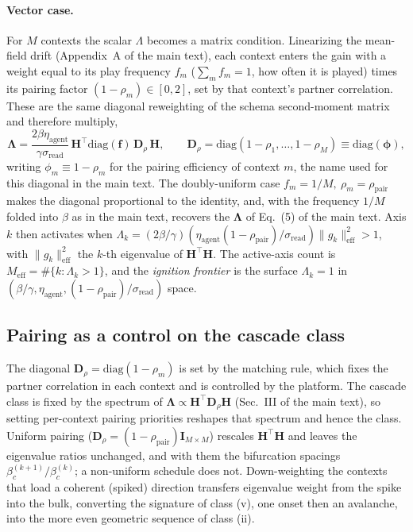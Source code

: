 \documentclass[
  aps,prx,
  preprint,
  superscriptaddress,
  nofootinbib
]{revtex4-2}
\newcommand{\Lam}{\bm{\Lambda}}
\newcommand{\Id}{\mathbf{I}}
\newcommand{\etaag}{\eta_{\mathrm{agent}}}
\newcommand{\rhopair}{\rho_{\mathrm{pair}}}
\newcommand{\sread}{\sigma_{\mathrm{read}}}
\begin{document}
\paragraph{Vector case.} For $M$ contexts the scalar $\Lambda$ becomes a matrix condition. Linearizing the mean-field drift (Appendix~A of the main text), each context enters the gain with a weight equal to its play frequency $f_m$ ($\sum_m f_m=1$, how often it is played) times its pairing factor $(1-\rho_m)\in[0,2]$, set by that context's partner correlation. These are the same diagonal reweighting of the schema second-moment matrix and therefore multiply,
\begin{equation}\label{SM-eq:sm-Geff}
\Lam=\frac{2\beta\etaag}{\gamma\sread}\,\bm{H}^{\!\top}\mathrm{diag}(\mathbf{f})\,\bm{D}_\rho\,\bm{H},\qquad \bm{D}_\rho=\mathrm{diag}(1-\rho_1,\dots,1-\rho_M)\equiv\mathrm{diag}(\bm{\phi}),
\end{equation}
writing $\phi_m\equiv1-\rho_m$ for the pairing efficiency of context $m$, the name used for this
diagonal in the main text. The doubly-uniform case $f_m=1/M,\ \rho_m=\rhopair$ makes the diagonal proportional to the identity, and, with the frequency $1/M$ folded into $\beta$ as in the main text, recovers the $\Lam$ of Eq.~(5) of the main text. Axis $k$ then activates when $\Lambda_k=(2\beta/\gamma)(\etaag(1-\rhopair)/\sread)\|g_k\|^2_{\mathrm{eff}}>1$, with $\|g_k\|^2_{\mathrm{eff}}$ the $k$-th eigenvalue of $\bm{H}^{\!\top}\!\bm{H}$. The active-axis count is $M_{\mathrm{eff}}=\#\{k:\Lambda_k>1\}$, and the \emph{ignition frontier} is the surface $\Lambda_k=1$ in $(\beta/\gamma,\etaag,(1-\rhopair)/\sread)$ space.

\subsection{Pairing as a control on the cascade class}\label{sm:pairing}

\noindent The diagonal $\bm{D}_\rho=\mathrm{diag}(1-\rho_m)$ is set by the matching rule, which fixes the partner correlation in each context and is controlled by the platform. The cascade class is fixed by the spectrum of $\Lam\propto\bm{H}^{\!\top}\bm{D}_\rho\bm{H}$ (Sec.~III of the main text), so setting per-context pairing priorities reshapes that spectrum and hence the class. Uniform pairing ($\bm{D}_\rho=(1-\rhopair)\Id_{M\times M}$) rescales $\bm{H}^{\!\top}\bm{H}$ and leaves the eigenvalue ratios unchanged, and with them the bifurcation spacings $\beta_c^{(k+1)}/\beta_c^{(k)}$; a non-uniform schedule does not. Down-weighting the contexts that load a coherent (spiked) direction transfers eigenvalue weight from the spike into the bulk, converting the signature of class (v), one onset then an avalanche, into the more even geometric sequence of class (ii).
\end{document}
